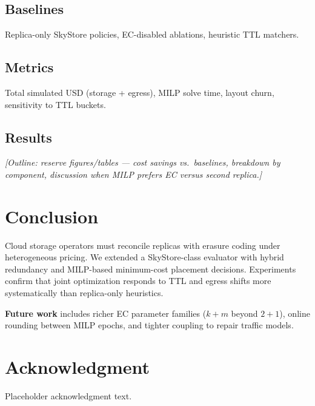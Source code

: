 \documentclass[conference]{IEEEtran}
\begin{document}
\subsection{Baselines}
Replica-only SkyStore policies, EC-disabled ablations, heuristic TTL matchers.

\subsection{Metrics}
Total simulated USD (storage + egress), MILP solve time, layout churn, sensitivity to TTL buckets.

\subsection{Results}
\textit{[Outline: reserve figures/tables --- cost savings vs.\ baselines, breakdown by component, discussion when MILP prefers EC versus second replica.]}

\section{Conclusion}
\label{sec:conclusion}

Cloud storage operators must reconcile replicas with erasure coding under heterogeneous pricing.
We extended a SkyStore-class evaluator with hybrid redundancy and MILP-based minimum-cost placement decisions.
Experiments confirm that joint optimization responds to TTL and egress shifts more systematically than replica-only heuristics.

\textbf{Future work} includes richer EC parameter families (\(k{+}m\) beyond \(2{+}1\)), online rounding between MILP epochs, and tighter coupling to repair traffic models.

\section*{Acknowledgment}
Placeholder acknowledgment text.



\end{document}
